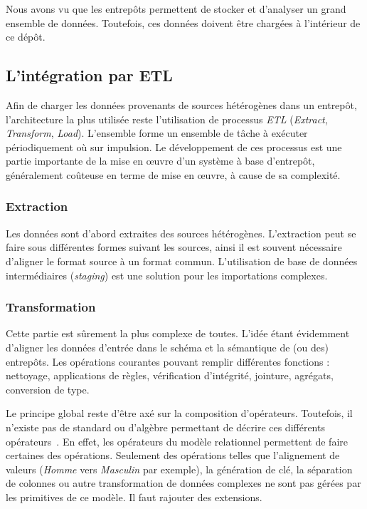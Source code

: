 Nous avons vu que les entrepôts permettent de stocker et d'analyser un grand ensemble de données. Toutefois, ces données doivent être chargées à l'intérieur de ce dépôt.
\subsection{L'intégration par ETL}\label{sec:rw:supervision:warehouse:etl}
Afin de charger les données provenants de sources hétérogènes dans un entrepôt, l'architecture la plus utilisée reste l'utilisation de processus \textit{ETL} (\textit{Extract}, \textit{Transform}, \textit{Load}). L'ensemble forme un ensemble de tâche à exécuter périodiquement où sur impulsion. Le développement de ces processus est une partie importante de la mise en œuvre d'un système à base d'entrepôt, généralement coûteuse en terme de mise en œuvre, à cause de sa complexité.
\subsubsection{Extraction}
Les données sont d'abord extraites des sources hétérogènes. L'extraction peut se faire sous différentes formes suivant les sources, ainsi il est souvent nécessaire d'aligner le format source à un format commun. L'utilisation de base de données intermédiaires (\textit{staging}) est une solution pour les importations complexes.

\subsubsection{Transformation}
Cette partie est sûrement la plus complexe de toutes. L'idée étant évidemment d'aligner les données d'entrée dans le schéma et la sémantique de (ou des) entrepôts. Les opérations courantes pouvant remplir différentes fonctions : nettoyage, applications de règles, vérification d'intégrité, jointure, agrégats, conversion de type. 

Le principe global reste d'être axé sur la composition d'opérateurs. Toutefois, il n'existe pas de standard ou d'algèbre permettant de décrire ces différents opérateurs~\cite{Vassiliadis:taxonomy}. En effet, les opérateurs du modèle relationnel permettent de faire certaines des opérations. Seulement des opérations telles que l'alignement de valeurs (\textit{Homme} vers \textit{Masculin} par exemple), la génération de clé, la séparation de colonnes ou autre transformation de données complexes ne sont pas gérées par les primitives de ce modèle. Il faut rajouter des extensions. 

